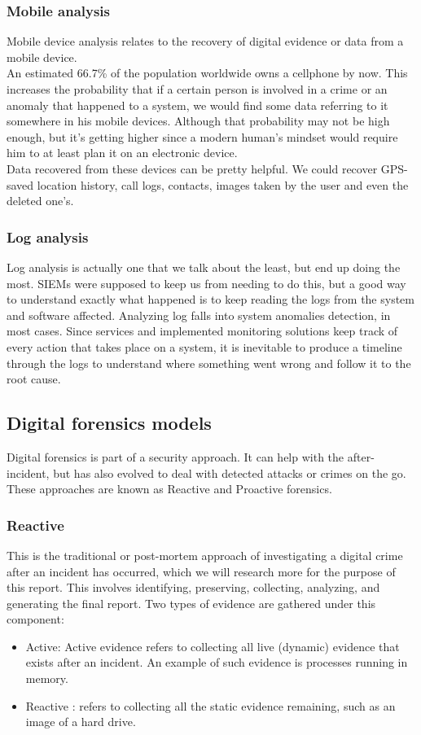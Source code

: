 \subsubsection{Mobile analysis}
Mobile device analysis relates to the recovery of digital evidence or data from a mobile device.\\
An estimated 66.7\% of the population worldwide owns a cellphone by now. This increases the probability that if a certain person is involved in a crime or an anomaly that happened to a system, we would find some data referring to it somewhere in his mobile devices. Although that probability may not be high enough, but it's getting higher since a modern human's mindset would require him to at least plan it on an electronic device.\\
Data recovered from these devices can be pretty helpful. We could recover GPS-saved location history, call logs, contacts, images taken by the user and even the deleted one's.

\subsubsection{Log analysis}
Log analysis is actually one that we talk about the least, but end up doing the most. SIEMs were supposed to keep us from needing to do this, but a good way to understand exactly what happened is to keep reading the logs from the system and software affected. Analyzing log falls into system anomalies detection, in most cases. Since services and implemented monitoring solutions keep track of every action that takes place on a system, it is inevitable to produce a timeline through the logs to understand where something went wrong and follow it to the root cause.

\subsection{Digital forensics models}
Digital forensics is part of a security approach. It can help with the after-incident, but has also evolved to deal with detected attacks or crimes on the go. These approaches are known as Reactive and Proactive forensics.
\subsubsection{Reactive}
This is the traditional or post-mortem approach of investigating a digital crime after an incident has occurred, which we will research more for the purpose of this report. This involves identifying, preserving, collecting, analyzing, and generating the final report. Two types of evidence are gathered under this component:
\begin{itemize}
    \item Active: Active evidence refers to collecting all live (dynamic) evidence that exists after an incident. An example of such evidence is processes running in memory.
    \item Reactive : refers to collecting all the static evidence remaining, such as an image of a hard drive.
\end{itemize}
